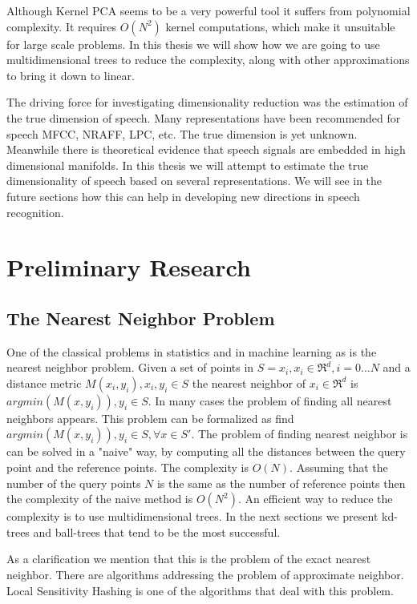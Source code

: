 \documentclass[12pt,letterpaper,doublespaced,ETD,dvips,proposal]{gtthesis}
\begin{document}
\begin{Body}
Although Kernel PCA seems to be a very powerful tool it suffers from
polynomial complexity. It requires $O(N^2)$ kernel computations,
which make it unsuitable for large scale problems. In this thesis we
will show how we are going to use multidimensional trees to reduce
the complexity, along with other approximations to bring it down to
linear.

The driving force for investigating dimensionality reduction was the
estimation of the true dimension of speech. Many representations
have been recommended for speech MFCC, NRAFF, LPC, etc. The true
dimension is yet unknown. Meanwhile there is theoretical evidence
that speech signals are embedded in high dimensional manifolds. In
this thesis we will attempt to estimate the true dimensionality of
speech based on several representations. We will see in the future
sections how this can help in developing new directions in speech
recognition.




\section{Preliminary Research}
\label{prelim}
\subsection{The Nearest Neighbor Problem}
\label{The_Nearest_Neighbor_Problem}

One of the classical problems in statistics and in machine learning
as is the nearest neighbor problem. Given a set of points in $S =
{x_i, x_i\in\Re^d, i=0\dots N}$ and a distance metric $M(x_i, y_i),
x_i, y_i \in S$  the nearest neighbor of $x_i \in \Re^d$ is
$argmin(M(x, y_i)), y_i \in S$. In many cases the problem of finding
all nearest neighbors appears. This problem can be formalized as
find $argmin(M(x, y_i)), y_i \in S, \forall x \in S'$. The problem
of finding nearest neighbor is can be solved in a "naive" way, by
computing all the distances between the query point and the
reference points. The complexity is $O(N)$. Assuming that the number
of the query points $N$ is the same as the number of reference
points then the complexity of the naive method is $O(N^2)$. An
efficient way to reduce the complexity is to use multidimensional
trees. In the next sections we present kd-trees and ball-trees that
tend to be the most successful.

As a clarification we mention that this is the problem of the exact
nearest neighbor. There are algorithms addressing the problem of
approximate neighbor. Local Sensitivity Hashing is one of the
algorithms that deal with this problem.


\end{Body}
\end{document}
